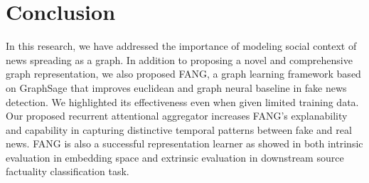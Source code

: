 \documentclass[fyp]{socreport}
\theoremstyle{definition}
\theoremstyle{hypothesis}
\begin{document}
\chapter{Conclusion}
In this research, we have addressed the importance of modeling social context of news spreading as a graph. In addition to proposing a novel and comprehensive graph representation, we also proposed FANG, a graph learning framework based on GraphSage that improves euclidean and graph neural baseline in fake news detection. We highlighted its effectiveness even when given limited training data. Our proposed recurrent attentional aggregator increases FANG's explanability and capability in capturing distinctive temporal patterns between fake and real news. FANG is also a successful representation learner as showed in both intrinsic evaluation in embedding space and extrinsic evaluation in downstream source factuality classification task.



\end{document}
